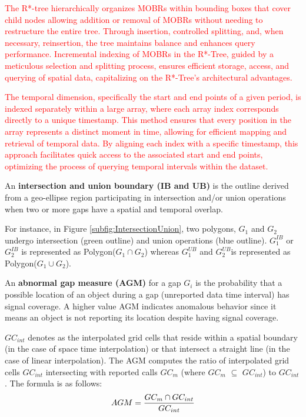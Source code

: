 \documentclass[acmsmall]{acmart}
\begin{document}
\textcolor{red}{The R*-tree hierarchically organizes MOBRs within bounding boxes that cover child nodes allowing addition or removal of MOBRs without needing to restructure the entire tree. Through insertion, controlled splitting, and, when necessary, reinsertion, the tree maintains balance and enhances query performance. Incremental indexing of MOBRs in the R*-Tree, guided by a meticulous selection and splitting process, ensures efficient storage, access, and querying of spatial data, capitalizing on the R*-Tree's architectural advantages.}

\textcolor{red}{The temporal dimension, specifically the start and end points of a given period, is indexed separately within a large array, where each array index corresponds directly to a unique timestamp. This method ensures that every position in the array represents a distinct moment in time, allowing for efficient mapping and retrieval of temporal data. By aligning each index with a specific timestamp, this approach facilitates quick access to the associated start and end points, optimizing the process of querying temporal intervals within the dataset.}

\begin{definition}
An \textbf{intersection and union boundary (IB and UB)} is the outline derived from a geo-ellipse region participating in intersection and/or union operations when two or more gaps have a spatial and temporal overlap. 
\end{definition}
For instance, in Figure \ref{subfig:IntersectionUnion}, two polygons, $G_{1}$ and $G_{2}$ undergo intersection (green outline) and union operations (blue outline). $G_{1}^{IB}$ or $G_{2}^{IB}$ is represented as Polygon($G_{1} \cap G_{2}$) whereas  $G_{1}^{UB}$ and $G_{2}^{UB}$is represented as Polygon($G_{1} \cup G_{2}$).

\begin{definition}
\label{def:AGM}
An \textbf{abnormal gap measure (AGM)} for a gap $G_{i}$ is the probability that a possible location of an object during a gap (unreported data time interval) has signal coverage. A higher value AGM indicates anomalous behavior since it means an object is not reporting its location despite having signal coverage.
\end{definition}
$GC_{int}$ denotes as the interpolated grid cells that reside within a spatial boundary (in the case of space time interpolation) or that intersect a  straight line (in the case of linear interpolation). The AGM computes the ratio of interpolated grid cells $GC_{int}$ intersecting with reported calls $GC_{m}$ (where $GC_{m}$ $\subseteq$ $GC_{int}$) to $GC_{int}$ . The formula is as follows:
\begin{equation}
\centering
   AGM = \frac{GC_{m} \cap GC_{int}}{GC_{int}}
\end{equation}
\end{document}

